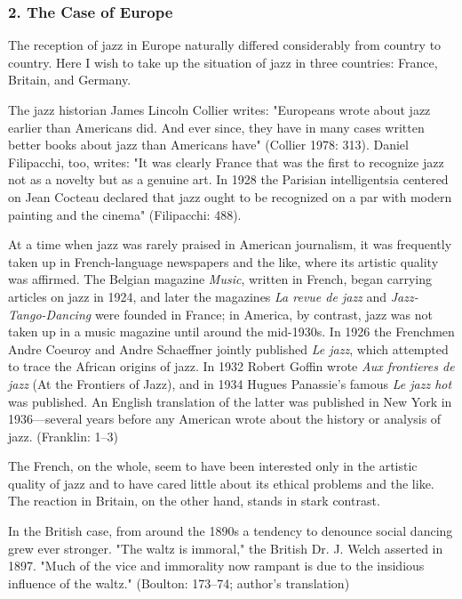 \subsubsection{2. The Case of Europe}

The reception of jazz in Europe naturally differed considerably from country to country. Here I wish to take up the situation of jazz in three countries: France, Britain, and Germany.

The jazz historian James Lincoln Collier writes: "Europeans wrote about jazz earlier than Americans did. And ever since, they have in many cases written better books about jazz than Americans have" (Collier 1978: 313). Daniel Filipacchi, too, writes: "It was clearly France that was the first to recognize jazz not as a novelty but as a genuine art. In 1928 the Parisian intelligentsia centered on Jean Cocteau declared that jazz ought to be recognized on a par with modern painting and the cinema" (Filipacchi: 488).

At a time when jazz was rarely praised in American journalism, it was frequently taken up in French-language newspapers and the like, where its artistic quality was affirmed. The Belgian magazine \textit{Music}, written in French, began carrying articles on jazz in 1924, and later the magazines \textit{La revue de jazz} and \textit{Jazz-Tango-Dancing} were founded in France; in America, by contrast, jazz was not taken up in a music magazine until around the mid-1930s. In 1926 the Frenchmen Andre Coeuroy and Andre Schaeffner jointly published \textit{Le jazz}, which attempted to trace the African origins of jazz. In 1932 Robert Goffin wrote \textit{Aux frontieres de jazz} (At the Frontiers of Jazz), and in 1934 Hugues Panassie's famous \textit{Le jazz hot} was published. An English translation of the latter was published in New York in 1936—several years before any American wrote about the history or analysis of jazz. (Franklin: 1–3)

The French, on the whole, seem to have been interested only in the artistic quality of jazz and to have cared little about its ethical problems and the like. The reaction in Britain, on the other hand, stands in stark contrast.

In the British case, from around the 1890s a tendency to denounce social dancing grew ever stronger. "The waltz is immoral," the British Dr. J. Welch asserted in 1897. "Much of the vice and immorality now rampant is due to the insidious influence of the waltz." (Boulton: 173–74; author's translation)

